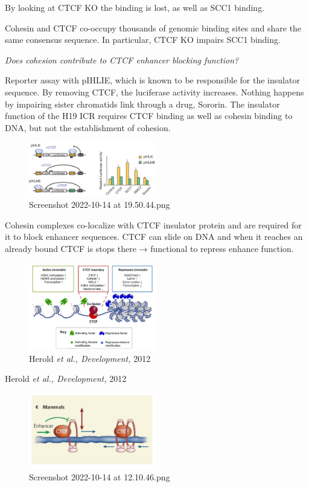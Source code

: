 By looking at CTCF KO the binding is lost, as well as SCC1 binding.

Cohesin and CTCF co-occupy thousands of genomic binding sites and share the same consensus sequence. In particular, CTCF KO impairs SCC1 binding.

\emph{Does cohesion contribute to CTCF enhancer blocking function?}

Reporter assay with pIHLIE, which is known to be responsible for the insulator sequence. By removing CTCF, the luciferase activity increases. Nothing happens by impairing sister chromatids link through a drug, Sororin. The insulator function of the H19 ICR requires CTCF binding as well as cohesin binding to DNA, but not the establishment of cohesion.

\begin{figure}
\centering
\includegraphics[width=0.5\textwidth]{../_resources/Screenshot_2022-10-14_at_19-50-44.png}
\caption{Screenshot 2022-10-14 at 19.50.44.png}
\end{figure}

Cohesin complexes co-localize with CTCF insulator protein and are required for it to block enhancer sequences. CTCF can slide on DNA and when it reaches an already bound CTCF is stops there → functional to repress enhance function.

\begin{figure}
\centering
\includegraphics[width=0.5\textwidth]{../_resources/Screenshot_2022-10-14_at_12-11-11.png}
\caption{Herold \emph{et al., Development,} 2012}
\end{figure}

Herold \emph{et al., Development,} 2012

\begin{figure}
\centering
\includegraphics[width=0.5\textwidth]{../_resources/Screenshot_2022-10-14_at_12-10-46.png}
\caption{Screenshot 2022-10-14 at 12.10.46.png}
\end{figure}

